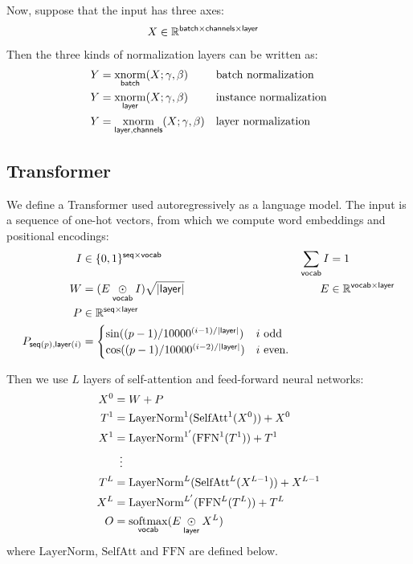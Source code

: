 \documentclass{article}
\newcommand{\reals}{\mathbb{R}}
\begin{document}
Now, suppose that the input has three axes:
\begin{align*}
X &\in \reals^{{\name{batch} \times \name{channels} \times \name{layer}}}
\end{align*}
Then the three kinds of normalization layers can be written as:
\begin{align*}
Y &= \mathop{\underset{\mathsf{batch}}{\mathrm{xnorm}}}(X; \gamma, \beta) && \text{batch normalization} \\
Y &= \mathop{\underset{\mathsf{layer}}{\mathrm{xnorm}}}(X; \gamma, \beta) && \text{instance normalization} \\
Y &= \mathop{\underset{\mathsf{layer,channels}}{\mathrm{xnorm}}}(X; \gamma, \beta) && \text{layer normalization}
\end{align*}

\subsection{Transformer}
\label{sec:transformer}

We define a Transformer used autoregressively as a language model.
The input is a sequence of one-hot vectors, from which we compute word embeddings and positional encodings:
\begin{align*}
  I &\in \{0, 1\}^{\name{seq} \times \name{vocab}} & \nsum{vocab} I &= 1 \\
  W &= (E \ndot{vocab} I)\sqrt{|\name{layer}|} & E &\in \reals^{\name{vocab} \times \name{layer}} \\
  P &\in \reals^{\name{seq} \times \name{layer}} \\
  P_{\nidx{seq}{p}, \nidx{layer}{i}} &= \begin{cases}
    \sin((p-1) / 10000^{(i-1) / |\name{layer}|}) & \text{$i$ odd} \\ 
    \cos((p-1) / 10000^{(i-2) / |\name{layer}|}) & \text{$i$ even.}
  \end{cases}
\end{align*}

Then we use $L$ layers of self-attention and feed-forward neural networks:
\begin{align*} 
X^0 &= W+P \\
T^1 &= \text{LayerNorm}^1(\text{SelfAtt}^1(X^0)) + X^0\\
X^1 &= \text{LayerNorm}^{1'}(\text{FFN}^1(T^1)) + T^1\\
&\vdotswithin{=} \\
T^{L} &= \text{LayerNorm}^L(\text{SelfAtt}^L(X^{L-1})) + X^{L-1}\\
X^{L} &= \text{LayerNorm}^{L'}(\text{FFN}^L(T^L)) + T^L\\
O &= \nfun{vocab}{softmax}(E \ndot{layer} X^L)
\end{align*}
where $\text{LayerNorm}$, $\text{SelfAtt}$ and $\text{FFN}$ are defined below.
\end{document}
